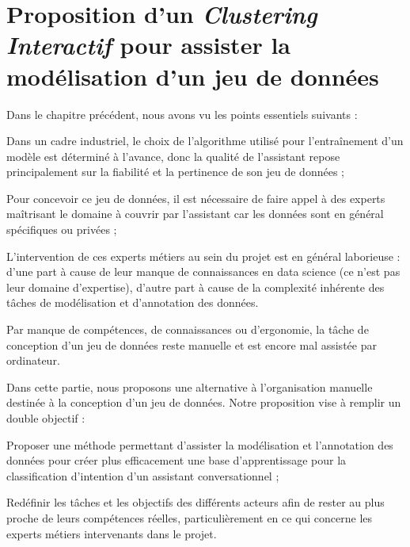 \chapter{Proposition d'un \textit{Clustering Interactif} pour assister la modélisation d'un jeu de données}
\label{chapter:3-CLUSTERING-INTERACTIF}
	
	Dans le chapitre précédent, nous avons vu les points essentiels suivants :
	\begin{leftBarImportantGreen}
		\begin{todolist}
			\item[\itemok] Dans un cadre industriel, le choix de l'algorithme utilisé pour l’entraînement d'un modèle est déterminé à l'avance, donc la qualité de l'assistant repose principalement sur la fiabilité et la pertinence de son jeu de données ;
			\item[\itemok] Pour concevoir ce jeu de données, il est nécessaire de faire appel à des experts maîtrisant le domaine à couvrir par l'assistant car les données sont en général spécifiques ou privées ;
			\item[\itemok] L'intervention de ces experts métiers au sein du projet est en général laborieuse :
			d'une part à cause de leur manque de connaissances en data science (ce n'est pas leur domaine d'expertise),
			d'autre part à cause de la complexité inhérente des tâches de modélisation et d'annotation des données.
			\item[\itemok] Par manque de compétences, de connaissances ou d'ergonomie, la tâche de conception d'un jeu de données reste manuelle et est encore mal assistée par ordinateur.
		\end{todolist}
	\end{leftBarImportantGreen}
	
	Dans cette partie, nous proposons une alternative à l'organisation manuelle destinée à la conception d'un jeu de données.
	Notre proposition vise à remplir un double objectif :
	\begin{leftBarImportantRed}
		\begin{todolist}
			\item Proposer une méthode permettant d'assister la modélisation et l'annotation des données pour créer plus efficacement une base d'apprentissage pour la classification d'intention d'un assistant conversationnel ;
			\item Redéfinir les tâches et les objectifs des différents acteurs afin de rester au plus proche de leurs compétences réelles, particulièrement en ce qui concerne les experts métiers intervenants dans le projet.
		\end{todolist}
	\end{leftBarImportantRed}


